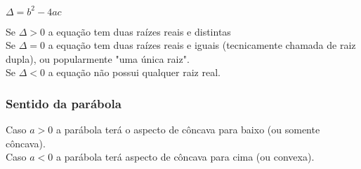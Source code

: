 		{\Large $ \Delta = b^{2} - 4ac $}
		
		\bigskip
		
		Se $ \Delta > 0 $ a equação tem duas raízes reais e distintas \\
		Se $ \Delta = 0 $ a equação tem duas raízes reais e iguais (tecnicamente chamada de raiz dupla), ou popularmente "uma única raiz". \\
		Se $ \Delta < 0 $ a equação não possui qualquer raiz real.
		
		\subsubsection{Sentido da parábola}
		
		Caso $ a > 0 $ a parábola terá o aspecto de côncava para baixo (ou somente côncava). \\
		Caso $ a < 0 $ a parábola terá aspecto de côncava para cima (ou convexa).